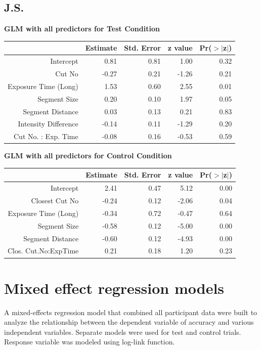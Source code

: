 \documentclass{article}
\begin{document}
\subsection*{J.S.}
\textbf{GLM with all predictors for Test Condition}
\begin{table}[ht]
\centering
\begin{tabular}{rrrrr}
  \hline
 & Estimate & Std. Error & z value & Pr($>$$|$z$|$) \\ 
  \hline
Intercept & 0.81 & 0.81 & 1.00 & 0.32 \\ 
  Cut No & -0.27 & 0.21 & -1.26 & 0.21 \\ 
  Exposure Time (Long) & 1.53 & 0.60 & 2.55 & 0.01 \\ 
  Segment Size & 0.20 & 0.10 & 1.97 & 0.05 \\ 
  Segment Distance & 0.03 & 0.13 & 0.21 & 0.83 \\ 
  Intensity Difference & -0.14 & 0.11 & -1.29 & 0.20 \\ 
  Cut No. : Exp. Time & -0.08 & 0.16 & -0.53 & 0.59 \\ 
   \hline
\end{tabular}
\end{table}

\textbf{GLM with all predictors for Control Condition}
\begin{table}[ht]
\centering
\begin{tabular}{rrrrr}
  \hline
 & Estimate & Std. Error & z value & Pr($>$$|$z$|$) \\ 
  \hline
Intercept & 2.41 & 0.47 & 5.12 & 0.00 \\ 
  Closest Cut No & -0.24 & 0.12 & -2.06 & 0.04 \\ 
  Exposure Time (Long) & -0.34 & 0.72 & -0.47 & 0.64 \\ 
  Segment Size & -0.58 & 0.12 & -5.00 & 0.00 \\ 
  Segment Distance & -0.60 & 0.12 & -4.93 & 0.00 \\ 
  Clos. Cut.No:ExpTime & 0.21 & 0.18 & 1.20 & 0.23 \\ 
   \hline
\end{tabular}
\end{table}

\clearpage

\section{Mixed effect regression models}
A mixed-effects regression model that combined all participant data were built to analyze the relationship between the dependent variable of accuracy and various independent variables. Separate models were used for test and control trials. Response variable was modeled using log-link function.
\end{document}
